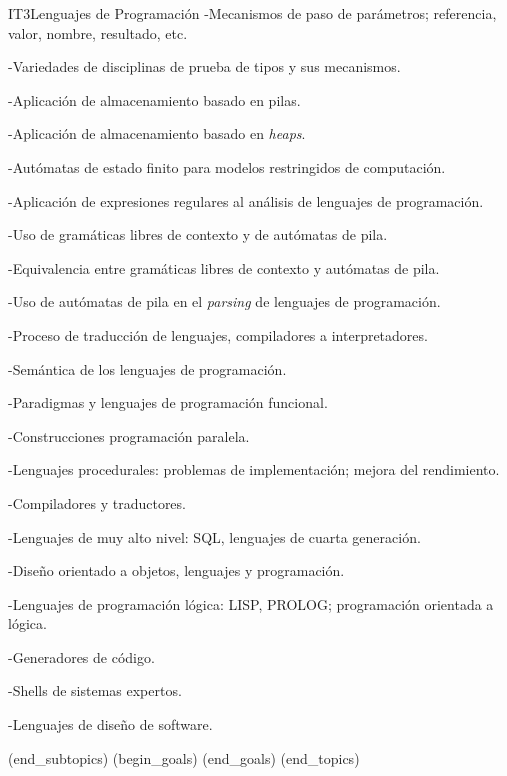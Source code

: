 \begin{BKL2}{IT3}{Lenguajes de Programación}
-Mecanismos de paso de parámetros; referencia, valor, nombre, resultado, etc.

-Variedades de disciplinas de prueba de tipos y sus mecanismos.

-Aplicación de almacenamiento basado en pilas.

-Aplicación de almacenamiento basado en {\it heaps}.

-Autómatas de estado finito para modelos restringidos de computación.

-Aplicación de expresiones regulares al análisis de lenguajes de programación.

-Uso de gramáticas libres de contexto y de autómatas de pila.

-Equivalencia entre gramáticas libres de contexto y autómatas de pila.

-Uso de autómatas de pila en el {\it parsing} de lenguajes de programación.

-Proceso de traducción de lenguajes, compiladores a interpretadores.

-Semántica de los lenguajes de programación.

-Paradigmas y lenguajes de programación funcional.

-Construcciones programación paralela.

-Lenguajes procedurales: problemas de implementación; mejora del rendimiento.

-Compiladores y traductores.

-Lenguajes de muy alto nivel: SQL, lenguajes de cuarta generación.

-Diseño orientado a objetos, lenguajes y programación.

-Lenguajes de programación lógica: LISP, PROLOG; programación orientada a lógica.

-Generadores de código.

-Shells de sistemas expertos.

-Lenguajes de diseño de software.

(end_subtopics)
(begin_goals)
(end_goals)
(end_topics)

\end{BKL2}
 

